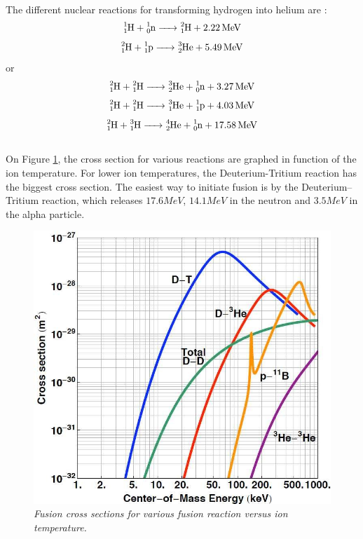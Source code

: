 \\
\normalsize{\indent The different nuclear reactions for transforming hydrogen into helium are \cite{diekmann_energie:_2014}:}
\begin{equation}
    \ce{^1_1H + ^1_0n -> ^2_1H + 2.22 MeV}
\end{equation}
\begin{equation}
    \ce{^2_1H + ^1_1p -> ^3_2He + 5.49 MeV}
\end{equation}
\normalsize{\indent or}
\begin{equation}
    \ce{^2_1H + ^2_1H -> ^3_2He + ^1_0n + 3.27 MeV}
\end{equation}
\begin{equation}
    \ce{^2_1H + ^2_1H -> ^3_1He + ^1_1p + 4.03 MeV}
\end{equation}
\begin{equation}
    \ce{^2_1H + ^3_1H -> ^4_2He + ^1_0n + 17.58 MeV}
\end{equation}
\\
\normalsize{\indent On Figure \ref{fig:fig_2_2}, the cross section for various reactions are graphed in function of the ion temperature. For lower ion temperatures, the Deuterium-Tritium reaction has the biggest cross section. The easiest way to initiate fusion is by the Deuterium–Tritium reaction, which releases $17.6 MeV$, $14.1 MeV$ in the neutron and $3.5 MeV$ in the alpha particle. \cite{Freidberg_2007}}
\\
\begin{figure}[h!]
    \centering
    \includegraphics[width=.7\textwidth]{figures/fig_5.png}
    \caption{\it Fusion cross sections for various fusion reaction versus ion temperature. \cite{Moiraf2020}}
    \label{fig:fig_2_2}
\end{figure}
